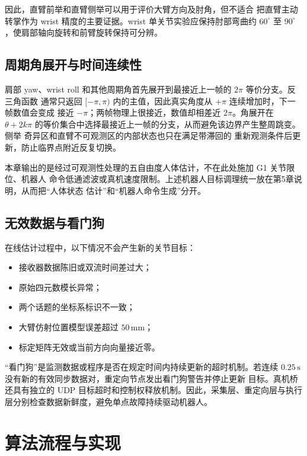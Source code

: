 因此，直臂前举和直臂侧举可以用于评价大臂方向及肘角，但不适合
把直臂主动转掌作为 wrist 精度的主要证据。wrist 单关节实验应保持肘部弯曲约 $60^\circ$
至 $90^\circ$，使肩部轴向旋转和前臂旋转保持可分辨。

\subsection{周期角展开与时间连续性}
\label{subsec:ch4_temporal_conditioning}

肩部 yaw、wrist roll 和其他周期角首先展开到最接近上一帧的 $2\pi$ 等价分支。反三角函数
通常只返回 $[-\pi,\pi)$ 内的主值，因此真实角度从 $+\pi$ 连续增加时，下一帧数值会变成
接近 $-\pi$；两帧物理上很接近，数值却相差近 $2\pi$。角展开在
$\theta+2k\pi$ 的等价集合中选择最接近上一帧的分支，从而避免该边界产生整周跳变。侧举
奇异区和直臂不可观测区的内部状态也只在满足带滞回的
重新观测条件后更新，防止临界点附近反复切换。

本章输出的是经过可观测性处理的五自由度人体估计，不在此处施加 G1 关节限位、机器人
命令低通滤波或真机速度限制。上述机器人目标调理统一放在第5章说明，从而把“人体状态
估计”和“机器人命令生成”分开。

\subsection{无效数据与看门狗}
\label{subsec:ch4_invalid_data_watchdog}

在线估计过程中，以下情况不会产生新的关节目标：
\begin{itemize}
  \item 接收器数据陈旧或双流时间差过大；
  \item 原始四元数模长异常；
  \item 两个话题的坐标系标识不一致；
  \item 大臂仿射位置模型误差超过 $50\,\mathrm{mm}$；
  \item 标定矩阵无效或当前方向向量接近零。
\end{itemize}

“看门狗”是监测数据或程序是否在规定时间内持续更新的超时机制。若连续
$0.25\,\mathrm{s}$ 没有新的有效同步数据对，重定向节点发出看门狗警告并停止更新
目标。真机桥还具有独立的 UDP 目标超时和控制权释放机制。因此，采集层、重定向层与执行
层分别检查数据新鲜度，避免单点故障持续驱动机器人。

\section{算法流程与实现}
\label{sec:ch4_algorithm_implementation}

